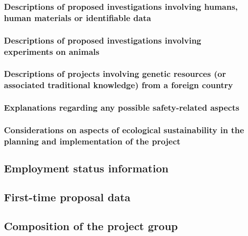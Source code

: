 \documentclass{scrartcl}
\begin{document}
\subsubsection{Descriptions of proposed investigations involving humans, human materials or identifiable data}

\subsubsection{Descriptions of proposed investigations involving experiments on animals}

\subsubsection{Descriptions of projects involving genetic resources (or associated traditional knowledge) from a foreign country}

\subsubsection{Explanations regarding any possible safety-related aspects}



\subsubsection{Considerations on aspects of ecological sustainability in the planning and implementation of the project}

\subsection{Employment status information}

\subsection{First-time proposal data}

\subsection{Composition of the project group}
\end{document}
